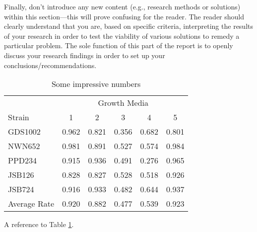 \documentclass[peerreview]{IEEEtran}
\begin{document}
Finally, don’t introduce any new content (e.g., research methods or solutions) within this section---this will prove confusing for the reader. The reader should clearly understand that you are, based on specific criteria, interpreting the results of your research in order to test the viability of various solutions to remedy a particular problem. The sole function of this part of the report is to openly discuss your research findings in order to set up your conclusions/recommendations.


\begin{table} %
\centering %
\begin{tabular}{l c c c c c} %
\toprule %
& \multicolumn{5}{c}{Growth Media} \\ %
\cmidrule(l){2-6} %
Strain & 1 & 2 & 3 & 4 & 5\\ %
\midrule %
GDS1002 & 0.962 & 0.821 & 0.356 & 0.682 & 0.801\\ %
NWN652 & 0.981 & 0.891 & 0.527 & 0.574 & 0.984\\ %
PPD234 & 0.915 & 0.936 & 0.491 & 0.276 & 0.965\\ %
JSB126 & 0.828 & 0.827 & 0.528 & 0.518 & 0.926\\ %
JSB724 & 0.916 & 0.933 & 0.482 & 0.644 & 0.937\\ %
\midrule %
\midrule %
Average Rate & 0.920 & 0.882 & 0.477 & 0.539 & 0.923\\ %
\bottomrule %
\end{tabular}
\smallskip
\caption{Some impressive numbers} %
\label{tab:template} %
\end{table}
A reference to Table \ref{tab:template}.
\end{document}
